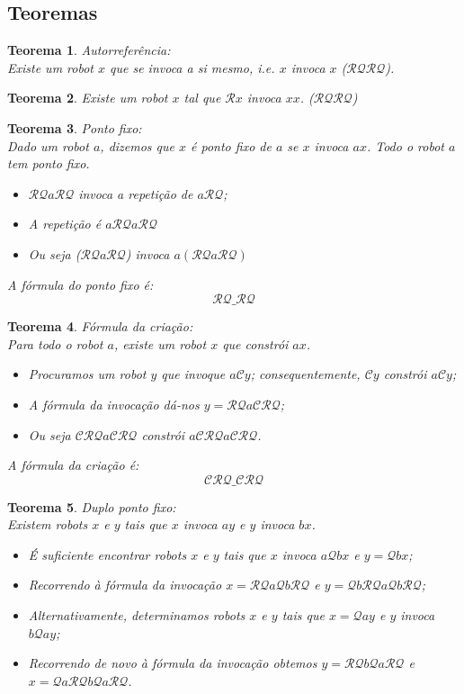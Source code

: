 \documentclass[10pt,a4paper]{report}
\newtheorem{theorem}{Teorema}
\begin{document}
\subsection{Teoremas}
\begin{theorem} Autorreferência:\\
Existe um robot $x$ que se invoca a si mesmo, i.e. $x$ invoca $x$ ($\mathcal{RQRQ}$).
\end{theorem}
\begin{theorem}
Existe um robot $x$ tal que $\mathcal{R}x$ invoca $xx$. ($\mathcal{RQRQ}$)
\end{theorem}
\begin{theorem} Ponto fixo:\\
Dado um robot $a$, dizemos que $x$ é ponto fixo de $a$ se $x$ invoca $ax$. Todo o robot $a$ tem ponto fixo.
\begin{itemize}
\item $\mathcal{RQ}a\mathcal{RQ}$ invoca a repetição de $a\mathcal{RQ}$;
\item A repetição é $a\mathcal{RQ}a\mathcal{RQ}$
\item Ou seja ($\mathcal{RQ}a\mathcal{RQ}$) invoca $a(\mathcal{RQ}a\mathcal{RQ})$
\end{itemize}
A fórmula do ponto fixo é:
$$
\mathcal{RQ}\_\mathcal{RQ}
$$
\end{theorem}
\begin{theorem} Fórmula da criação:\\
Para todo o robot $a$, existe um robot $x$ que constrói $ax$.
\begin{itemize}
\item Procuramos um robot $y$ que invoque $a\mathcal{C}y$; consequentemente, $\mathcal{C}y$ constrói $a\mathcal{C}y$;
\item A fórmula da invocação dá-nos $y = \mathcal{RQ}a\mathcal{CRQ}$;
\item Ou seja $\mathcal{CRQ}a\mathcal{CRQ}$ constrói $a\mathcal{CRQ}a\mathcal{CRQ}$.
\end{itemize}
A fórmula da criação é:
$$
\mathcal{CRQ}\_\mathcal{CRQ}
$$
\end{theorem}
\begin{theorem} Duplo ponto fixo:\\
Existem robots $x$ e $y$ tais que $x$ invoca $ay$ e $y$ invoca $bx$.
\begin{itemize}
\item É suficiente encontrar robots $x$ e $y$ tais que $x$ invoca $a\mathcal{Q}bx$ e $y = \mathcal{Q}bx$;
\item Recorrendo à fórmula da invocação $x = \mathcal{RQ}a\mathcal{Q}b\mathcal{RQ}$ e $y = \mathcal{Q}b\mathcal{RQ}a\mathcal{Q}b\mathcal{RQ}$;
\item Alternativamente, determinamos robots $x$ e $y$ tais que $x = \mathcal{Q}ay$ e $y$ invoca $b\mathcal{Q}ay$;
\item Recorrendo de novo à fórmula da invocação obtemos $y = \mathcal{RQ}b\mathcal{Q}a\mathcal{RQ}$ e $x = \mathcal{Q}a\mathcal{RQ}b\mathcal{Q}a\mathcal{RQ}$.
\end{itemize}
\end{theorem}
\end{document}
